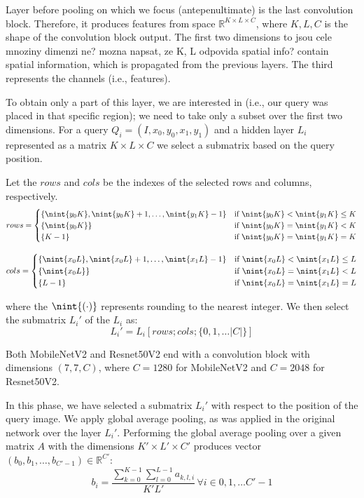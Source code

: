 Layer before pooling on which we focus (antepenultimate) is the last convolution block. Therefore, it produces features from space $\mathbb{R}^{K\times L \times C}$, where $K, L, C$ is the shape of the convolution block output. The first two dimensions {\color{red} to jsou cele mnoziny dimenzi ne? mozna napsat, ze K, L odpovida spatial info?} contain spatial information, which is propagated from the previous layers. The third represents the channels (i.e., features).

To obtain only a part of this layer, we are interested in (i.e., our query was placed in that specific region); we need to take only a subset over the first two dimensions. For a query $Q_i = (I, x_0, y_0, x_1, y_1)$ and a hidden layer $L_i$ represented as a matrix $K \times L \times C$ we select a submatrix based on the query position. 

Let the $rows$ and $cols$ be the indexes of the selected rows and columns, respectively. 
$$
    rows =
    \begin{cases}
        \{\nint{y_0 K}, \nint{y_0 K} + 1, \ldots, \nint{y_1 K}-1\} & \text{if } \nint{y_0K} < \nint{y_1K} \leq K \\
        \{\nint{y_0K}\} & \text{if } \nint{y_0K} = \nint{y_1K} < K\\
        \{K-1\} & \text{if } \nint{y_0K} = \nint{y_1K} = K\\
    \end{cases}
$$

$$
    cols =
    \begin{cases}
        \{\nint{x_0 L}, \nint{x_0 L} + 1, \ldots, \nint{x_1 L}-1\} & \text{if } \nint{x_0L} < \nint{x_1L} \leq L \\
        \{\nint{x_0L}\} & \text{if } \nint{x_0L} = \nint{x_1L} < L\\
        \{L-1\} & \text{if } \nint{x_0L} = \nint{x_1L} = L\\
    \end{cases}
$$

where the $\nint{(\cdot)}$ represents rounding to the nearest integer. We then select the submatrix $L_i'$ of the $L_i$ as: 
$$
L_i' = L_i[rows; cols; \{0, 1, \ldots |C|\}]
$$

Both MobileNetV2 and Resnet50V2 end with a convolution block with dimensions $(7,7,C)$, where $C = 1280$ for MobileNetV2 and $C = 2048$ for Resnet50V2. 

In this phase, we have selected a submatrix $L_i'$ with respect to the position of the query image. We apply global average pooling, as was applied in the original network over the layer $L_i'$. Performing the global average pooling over a given matrix $A$ with the dimensions $K' \times L' \times C'$ produces vector $(b_0, b_1, \ldots, b_{C'-1}) \in \mathbb{R}^{C'}$:
$$
    b_i = \frac{\sum_{k=0}^{K-1} \sum_{l=0}^{L-1} a_{k, l, i}} {K'L'} \, \forall i \in {0, 1, \ldots C'-1}
$$

